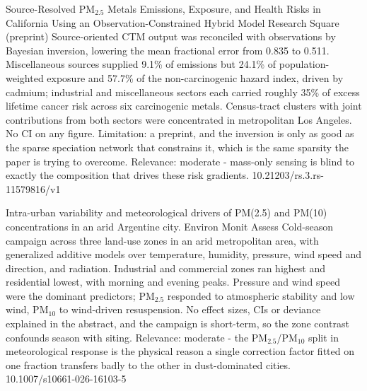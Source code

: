 \documentclass[10pt]{article}
\begin{document}
{Source-Resolved PM$_{2.5}$ Metals Emissions, Exposure, and Health Risks in California Using an Observation-Constrained Hybrid Model}
{Research Square (preprint)}
{Source-oriented CTM output was reconciled with observations by Bayesian inversion, lowering the mean fractional error from 0.835 to 0.511. Miscellaneous sources supplied 9.1\% of emissions but 24.1\% of population-weighted exposure and 57.7\% of the non-carcinogenic hazard index, driven by cadmium; industrial and miscellaneous sectors each carried roughly 35\% of excess lifetime cancer risk across six carcinogenic metals. Census-tract clusters with joint contributions from both sectors were concentrated in metropolitan Los Angeles. No CI on any figure. Limitation: a preprint, and the inversion is only as good as the sparse speciation network that constrains it, which is the same sparsity the paper is trying to overcome. Relevance: moderate - mass-only sensing is blind to exactly the composition that drives these risk gradients.}
{10.21203/rs.3.rs-11579816/v1}

{Intra-urban variability and meteorological drivers of PM(2.5) and PM(10) concentrations in an arid Argentine city.}
{Environ Monit Assess}
{Cold-season campaign across three land-use zones in an arid metropolitan area, with generalized additive models over temperature, humidity, pressure, wind speed and direction, and radiation. Industrial and commercial zones ran highest and residential lowest, with morning and evening peaks. Pressure and wind speed were the dominant predictors; PM$_{2.5}$ responded to atmospheric stability and low wind, PM$_{10}$ to wind-driven resuspension. No effect sizes, CIs or deviance explained in the abstract, and the campaign is short-term, so the zone contrast confounds season with siting. Relevance: moderate - the PM$_{2.5}$/PM$_{10}$ split in meteorological response is the physical reason a single correction factor fitted on one fraction transfers badly to the other in dust-dominated cities.}
{10.1007/s10661-026-16103-5}
\end{document}
